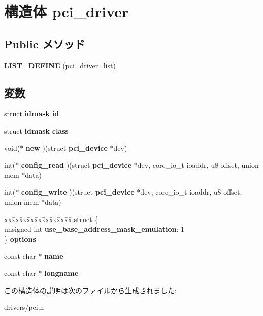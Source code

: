 \section{構造体 pci\-\_\-driver}
\label{structpci__driver}
\subsection*{\-Public メソッド}
\begin{DoxyCompactItemize}
\item 
{\bfseries \-L\-I\-S\-T\-\_\-\-D\-E\-F\-I\-N\-E} (pci\-\_\-driver\-\_\-list)\label{structpci__driver_ac7eeca00f4d9cacf41d704b0d4c6ec0a}

\end{DoxyCompactItemize}
\subsection*{変数}
\begin{DoxyCompactItemize}
\item 
struct {\bf idmask} {\bfseries id}\label{structpci__driver_a0addb7b97b3a219c2aeabc19fd0d8611}

\item 
struct {\bf idmask} {\bfseries class}\label{structpci__driver_aa077fa3233fa1f4a408862a0d125874b}

\item 
void($\ast$ {\bfseries new} )(struct {\bf pci\-\_\-device} $\ast$dev)\label{structpci__driver_a6fe4275794eddb8940181ae92d70e0c2}

\item 
int($\ast$ {\bfseries config\-\_\-read} )(struct {\bf pci\-\_\-device} $\ast$dev, core\-\_\-io\-\_\-t ioaddr, u8 offset, union mem $\ast$data)\label{structpci__driver_abfe1eac4a89ba9b8f6eca06174600e5c}

\item 
int($\ast$ {\bfseries config\-\_\-write} )(struct {\bf pci\-\_\-device} $\ast$dev, core\-\_\-io\-\_\-t ioaddr, u8 offset, union mem $\ast$data)\label{structpci__driver_a19191e5182a72b52036f848734282d30}

\item 
\begin{tabbing}
xx\=xx\=xx\=xx\=xx\=xx\=xx\=xx\=xx\=\kill
struct \{\\
\>unsigned int {\bfseries use\_base\_address\_mask\_emulation}: 1\\
\} {\bfseries options}\label{structpci__driver_a94f07c8dd495863eae7ecf56496a51cf}
\\

\end{tabbing}\item 
const char $\ast$ {\bfseries name}\label{structpci__driver_a05cc3c788ae87a07ae4d92ce603ce211}

\item 
const char $\ast$ {\bfseries longname}\label{structpci__driver_a465b7186b1c03f7c2d16ec53097bfc4d}

\end{DoxyCompactItemize}


この構造体の説明は次のファイルから生成されました\-:\begin{DoxyCompactItemize}
\item 
drivers/pci.\-h\end{DoxyCompactItemize}

